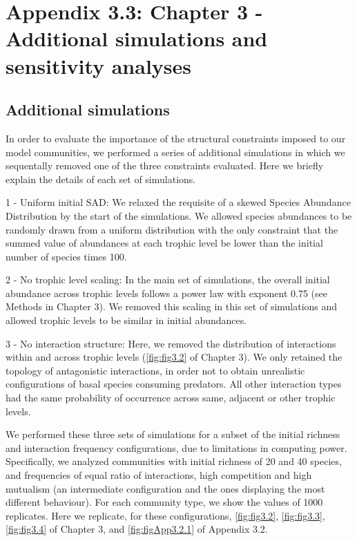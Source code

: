 \chapter[Appendix 3.3: Chapter 3 - Additional simulations]{Appendix 3.3: Chapter 3 - Additional simulations and sensitivity analyses}\label{ch:Appendix3.3}
\renewcommand{\thefigure}{A.3.3.\arabic{figure}}
\setcounter{figure}{0}

\renewcommand{\thetable}{A.3.3.\arabic{table}}
\setcounter{table}{0}

\section*{Additional simulations}

In order to evaluate the importance of the structural constraints imposed to our model communities, we performed a series of additional simulations in which we sequentally removed one of the three constraints evaluated. Here we briefly explain the details of each set of simulations.

1 - Uniform initial SAD: We relaxed the requisite of a skewed Species Abundance Distribution by the start of the simulations. We allowed species abundances to be randomly drawn from a uniform distribution with the only constraint that the summed value of abundances at each trophic level be lower than the initial number of species times 100.

2 - No trophic level scaling: In the main set of simulations, the overall initial abundance across trophic levels follows a power law with exponent 0.75 (see Methods in Chapter 3). We removed this scaling in this set of simulations and allowed trophic levels to be similar in initial abundances.

3 - No interaction structure: Here, we removed the distribution of interactions within and across trophic levels (\cref{fig:fig3.2} of Chapter 3). We only retained the topology of antagonistic interactions, in order not to obtain unrealistic configurations of basal species consuming predators. All other interaction types had the same probability of occurrence across same, adjacent or other trophic levels.

We performed these three sets of simulations for a subset of the initial richness and interaction frequency configurations, due to limitations in computing power. Specifically, we analyzed communities with initial richness of 20 and 40 species, and frequencies of equal ratio of interactions, high competition and high mutualism (an intermediate configuration and the ones displaying the most different behaviour). For each community type, we show the values of 1000 replicates. Here we replicate, for these configurations, \cref{fig:fig3.2}, \cref{fig:fig3.3}, \cref{fig:fig3.4} of Chapter 3, and \cref{fig:figApp3.2.1} of Appendix 3.2.

